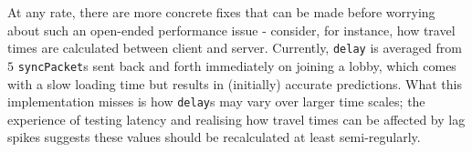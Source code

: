 \documentclass[a4paper, 9pt]{article}
\begin{document}
\begin{flushleft}
\vspace{5pt}\noindent
At any rate, there are more concrete fixes that can be made before worrying about such an open-ended performance issue - consider, for instance, how travel times are calculated between client and server. Currently, \texttt{delay} is averaged from $5$ \texttt{syncPacket}s sent back and forth immediately on joining a lobby, which comes with a slow loading time but results in (initially) accurate predictions. What this implementation misses is how \texttt{delay}s may vary over larger time scales; the experience of testing latency and realising how travel times can be affected by lag spikes suggests these values should be recalculated at least semi-regularly. %



\end{flushleft}
\end{document}
